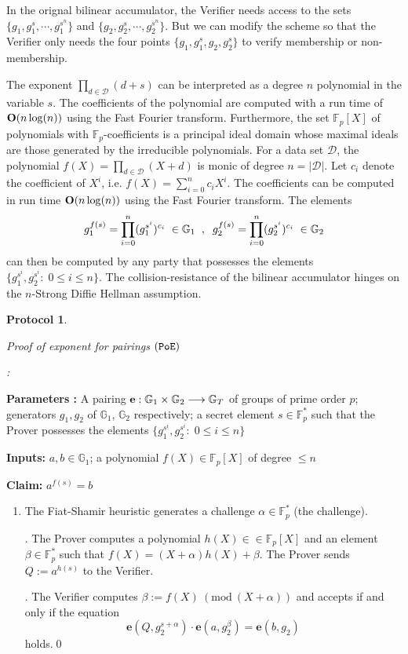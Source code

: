 \documentclass[11pt, lettersize, notitlepage, leqno, footskip=0.6cm]{article}
\newcommand{\bFp}{\mathbb{F}_p}
\newcommand{\lra}{\longrightarrow}
\newcommand{\mc}{\mathcal}
\newcommand{\mb}{\mathbb}
\newcommand{\al}{\alpha}
\newcommand{\be}{\beta}
\newcommand{\vs}{\vspace{-2mm}}
\newcommand{\Mod}[1]{\ (\mathrm{mod}\ #1)}
\newtheorem{Prot}[Thm]{Protocol}
\numberwithin{equation}{section}
\begin{document}
In the orignal bilinear accumulator, the Verifier needs access to the sets $\{g_1, g_1^s,\cdots , g_1^{s^n}\}$ and $\{g_2, g_2^s,\cdots , g_2^{s^n}\}$. But we can modify the scheme so that the Verifier only needs the four points $\{g_1,g_1^s, g_2, g_2^s \}$ to verify membership or non-membership.

The exponent $\prod\limits_{d\in \mc{D}} (d+s)$ can be interpreted as a degree $n$ polynomial in the variable $s$. The coefficients of the polynomial are computed with a run time of ${\bf{O}} (n\log(n))$ using the Fast Fourier transform. Furthermore, the set $\bFp[X]$ of polynomials with $\bFp$-coefficients is a principal ideal domain whose maximal ideals are those generated by the irreducible polynomials. For a data set $\mc{D}$, the polynomial $f(X) = \prod\limits_{d\in \mc{D}}(X+d)$ is monic of degree $n = |\mc{D}|$. Let $c_i$ denote the coefficient of $X^i$, i.e. $f(X) = \sum\limits_{i=0}^n c_iX^i$. The coefficients can be computed in run time ${\bf{O}}(n\log(n))$ using the Fast Fourier transform. The elements \vs $$g_1^{f(s)} = \prod\limits_{i=0}^n (g_1^{s^i})^{c_i}\;\in\mb{G}_1\;\;,\;\;g_2^{f(s)} = \prod\limits_{i=0}^n (g_2^{s^i})^{c_i}\;\in\mb{G}_2 \vs $$ can then be computed by any party that possesses the elements $\{g_1^{s^i}, g_2^{s^i} :\; 0\leq i \leq n  \}$. The collision-resistance of the bilinear accumulator hinges on the $n$-Strong Diffie Hellman assumption. 


\begin{Prot} \hypertarget{PoE}{ \textit{Proof of exponent for pairings} $(\tt{PoE})$}:\end{Prot} \vspace{-0.3cm}

\noindent \textbf{Parameters :} A pairing ${\bf{e}}: \mb{G}_1\times \mb{G}_2\lra \mb{G}_T$ of groups of prime order $p$; generators $g_1, g_2$ of $\mb{G}_1$, $\mb{G}_2$ respectively; a secret element $s\in \bFp^*$ such that the Prover possesses the elements $\{g_1^{s^i}, g_2^{s^i}:\; 0\leq i\leq n \}$ 

\noindent \textbf{Inputs:} $a,b\in \mb{G}_1$; a polynomial $f(X)\in \bFp[X]$ of degree $\leq n$

\noindent \textbf{Claim:} $a^{f(s)} = b$

\begin{enumerate}[wide, labelwidth=!, labelindent=0pt] \vs \item The Fiat-Shamir heuristic generates a challenge $\al\in \bFp^*$ (the challenge).

. The Prover computes a polynomial $h(X)\in \in \bFp[X]$ and an element $\be\in \bFp^*$ such that $f(X) = (X+\al)h(X)+ \be$. The Prover sends $Q:= a^{h(s)}$ to the Verifier.

. The Verifier computes $\be:= f(X)\Mod{(X+\al)}$ and accepts if and only if the equation \vs $$\mathbf{e}(Q, g_2^{s+\al})\cdot\mathbf{e}(a, g_2^{\be})  = \mathbf{e}(b, g_2)$$ holds.\qed \end{enumerate}
\end{document}

